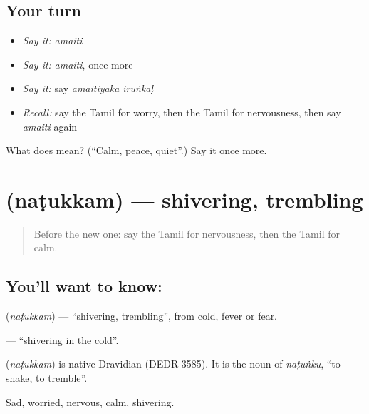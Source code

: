 \subsection*{Your turn}
\begin{itemize}
\raggedright
  \item \emph{Say it:} \emph{amaiti}
  \item \emph{Say it:} \emph{amaiti}, once more
  \item \emph{Say it:} say \emph{amaitiyāka iruṅkaḷ}
  \item \emph{Recall:} say the Tamil for worry, then the Tamil for nervousness, then say \emph{amaiti} again
\end{itemize}

\begin{tcolorbox}[breakable,colback=teal!4,colframe=teal!35!black,title={Before you move on}]
What does  mean? (\textquotedblleft{}Calm, peace, quiet\textquotedblright{}.) Say it once more.
\end{tcolorbox}
\section[\texorpdfstring{\ta{நடுக்கம்} (naṭukkam)}{நடுக்கம் (naṭukkam)}]{ (naṭukkam) — shivering, trembling}

\label{lesson:TA-C89-shivering}



\begin{quote}
Before the new one: say the Tamil for nervousness, then the Tamil for calm.
\end{quote}

\subsection*{You'll want to know: }
\textbf{} (\emph{naṭukkam}) — \textquotedblleft{}shivering, trembling\textquotedblright{}, from cold, fever or fear.

\textbf{ } — \textquotedblleft{}shivering in the cold\textquotedblright{}.

\begin{cousinweb}
\textbf{} (\emph{naṭukkam}) is native Dravidian (DEDR 3585). It is the noun of \emph{naṭuṅku}, \textquotedblleft{}to shake, to tremble\textquotedblright{}.
\end{cousinweb}

\begin{grammarlens}[title={What you've built}]
Sad, worried, nervous, calm, shivering.
\end{grammarlens}

